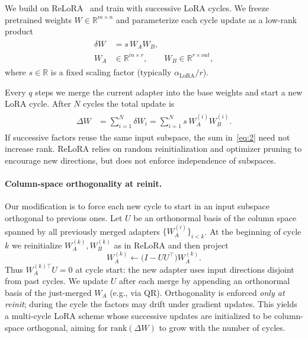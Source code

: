 We build on ReLoRA~\cite{lialin2023stack} and train with successive LoRA cycles.
We freeze pretrained weights $W \in \mathbb{R}^{m \times n}$ and parameterize each cycle update as a low-rank product
\begin{align}
\begin{split}
\delta W &= s\, W_A W_B,\\
W_A &\in \mathbb{R}^{in \times r},\qquad
W_B \in \mathbb{R}^{r \times out},
\end{split}
\label{eq:1}
\end{align}
where $s \in \mathbb{R}$ is a fixed scaling factor (typically $\alpha_{\mathrm{LoRA}}/r$).

Every $q$ steps we merge the current adapter into the base weights and start a new LoRA cycle.
After $N$ cycles the total update is
\begin{align}
\begin{split}
\Delta W
&= \sum_{i=1}^{N} \delta W_i
= \sum_{i=1}^{N} s\, W_A^{(i)} W_B^{(i)}.
\end{split}
\label{eq:2}
\end{align}
If successive factors reuse the same input subspace, the sum in~\eqref{eq:2} need not increase rank.
ReLoRA relies on random reinitialization and optimizer pruning to encourage new directions, but does not enforce independence of subspaces.

\paragraph{Column-space orthogonality at reinit.}
Our modification is to force each new cycle to start in an input subspace orthogonal to previous ones.
Let $U$ be an orthonormal basis of the column space spanned by all previously merged adapters $\{W_A^{(i)}\}_{i<k}$.
At the beginning of cycle $k$ we reinitialize $W_A^{(k)}, W_B^{(k)}$ as in ReLoRA and then project
\begin{equation}
W_A^{(k)} \leftarrow \bigl(I - U U^\top\bigr) W_A^{(k)}.
\label{eq:orth}
\end{equation}
Thus $W_A^{(k)\top} U = 0$ at cycle start: the new adapter uses input directions disjoint from past cycles.
We update $U$ after each merge by appending an orthonormal basis of the just-merged $W_A$ (e.g., via QR).
Orthogonality is enforced \emph{only at reinit}; during the cycle the factors may drift under gradient updates.
This yields a multi-cycle LoRA scheme whose successive updates are initialized to be column-space orthogonal, aiming for
$\mathrm{rank}(\Delta W)$ to grow with the number of cycles.

